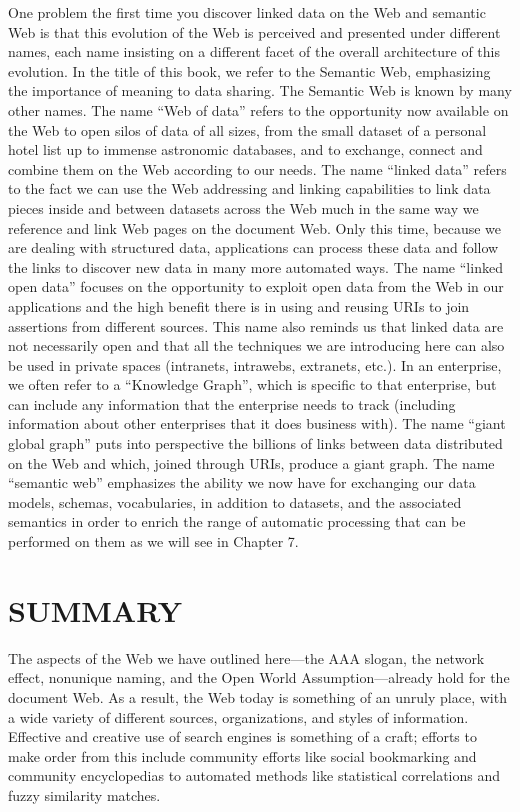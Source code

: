 One problem the first time you discover linked data on the Web and
semantic Web is that this evolution of the Web is perceived and
presented under different names, each name insisting on a different
facet of the overall architecture of this evolution. In the title of
this book, we refer to the Semantic Web, emphasizing the importance of
meaning to data sharing. The Semantic Web is known by many other names.
The name ``Web of data'' refers to the opportunity now available on the
Web to open silos of data of all sizes, from the small dataset of a
personal hotel list up to immense astronomic databases, and to exchange,
connect and combine them on the Web according to our needs. The name
``linked data'' refers to the fact we can use the Web addressing and
linking capabilities to link data pieces inside and between datasets
across the Web much in the same way we reference and link Web pages on
the document Web. Only this time, because we are dealing with structured
data, applications can process these data and follow the links to
discover new data in many more automated ways. The name ``linked open
data'' focuses on the opportunity to exploit open data from the Web in
our applications and the high benefit there is in using and reusing URIs
to join assertions from different sources. This name also reminds us
that linked data are not necessarily open and that all the techniques we
are introducing here can also be used in private spaces (intranets,
intrawebs, extranets, etc.). In an enterprise, we often refer to a
``Knowledge Graph'', which is specific to that enterprise, but can
include any information that the enterprise needs to track (including
information about other enterprises that it does business with). The
name ``giant global graph'' puts into perspective the billions of links
between data distributed on the Web and which, joined through URIs,
produce a giant graph. The name ``semantic web'' emphasizes the ability
we now have for exchanging our data models, schemas, vocabularies, in
addition to datasets, and the associated semantics in order to enrich
the range of automatic processing that can be performed on them as we
will see in Chapter 7.

\section{SUMMARY}

The aspects of the Web we have outlined here---the AAA slogan, the
network effect, nonunique naming, and the Open World
Assumption---already hold for the document Web. As a result, the Web
today is something of an unruly place, with a wide variety of different
sources, organizations, and styles of information. Effective and
creative use of search engines is something of a craft; efforts to make
order from this include community efforts like social bookmarking and
community encyclopedias to automated methods like statistical
correlations and fuzzy similarity matches.

